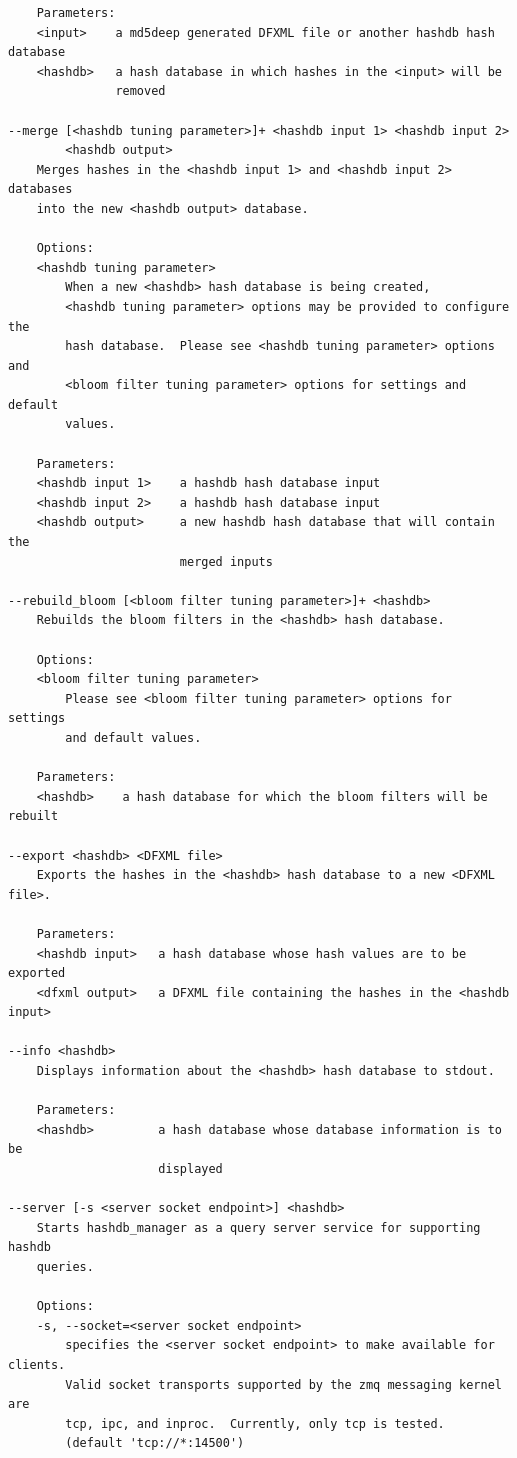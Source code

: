 \documentclass[11pt,twoside]{article}
\begin{document}
\begin{small}
\begin{verbatim}
    Parameters:
    <input>    a md5deep generated DFXML file or another hashdb hash database
    <hashdb>   a hash database in which hashes in the <input> will be
               removed

--merge [<hashdb tuning parameter>]+ <hashdb input 1> <hashdb input 2>
        <hashdb output>
    Merges hashes in the <hashdb input 1> and <hashdb input 2> databases
    into the new <hashdb output> database.

    Options:
    <hashdb tuning parameter>
        When a new <hashdb> hash database is being created,
        <hashdb tuning parameter> options may be provided to configure the
        hash database.  Please see <hashdb tuning parameter> options and
        <bloom filter tuning parameter> options for settings and default
        values.

    Parameters:
    <hashdb input 1>    a hashdb hash database input
    <hashdb input 2>    a hashdb hash database input
    <hashdb output>     a new hashdb hash database that will contain the
                        merged inputs

--rebuild_bloom [<bloom filter tuning parameter>]+ <hashdb>
    Rebuilds the bloom filters in the <hashdb> hash database.

    Options:
    <bloom filter tuning parameter>
        Please see <bloom filter tuning parameter> options for settings
        and default values.

    Parameters:
    <hashdb>    a hash database for which the bloom filters will be rebuilt

--export <hashdb> <DFXML file>
    Exports the hashes in the <hashdb> hash database to a new <DFXML file>.

    Parameters:
    <hashdb input>   a hash database whose hash values are to be exported
    <dfxml output>   a DFXML file containing the hashes in the <hashdb input>

--info <hashdb>
    Displays information about the <hashdb> hash database to stdout.

    Parameters:
    <hashdb>         a hash database whose database information is to be
                     displayed

--server [-s <server socket endpoint>] <hashdb>
    Starts hashdb_manager as a query server service for supporting hashdb
    queries.

    Options:
    -s, --socket=<server socket endpoint>
        specifies the <server socket endpoint> to make available for clients.
        Valid socket transports supported by the zmq messaging kernel are
        tcp, ipc, and inproc.  Currently, only tcp is tested.
        (default 'tcp://*:14500')


\end{verbatim}
\end{small}
\end{document}
